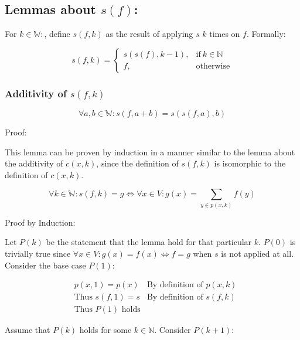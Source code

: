 \documentclass[11pt]{article}
\begin{document}
\subsection{Lemmas about $s(f)$:}

For $k\in \mathbb{W}:$, define $s(f,k)$ as the result of applying $s$ $k$ times on $f$. Formally:

\begin{equation}
    s(f,k)=
        \begin{cases}
            s(s(f),k-1), & \text{if}\ k \in \mathbb{N} \\
            f, & \text{otherwise}
        \end{cases}
    \label{define_sfk}
\end{equation}

\subsubsection{Additivity of $s(f,k)$}

\begin{equation}
    \forall a,b \in \mathbb{W}: s(f,a+b) = s(s(f,a),b)
    \label{additivity_sfk}
\end{equation}

Proof:

This lemma can be proven by induction in a manner similar to the lemma about the additivity of $c(x,k)$, since the definition of $s(f,k)$ is isomorphic to the definition of $c(x,k)$.

\begin{equation}
    \forall k \in \mathbb{W}: s(f,k)=g \Leftrightarrow \forall x \in V: g(x) = \sum_{y \in p(x,k)} f(y)
    \label{alternate_sfk}
\end{equation}

Proof by Induction:

Let $P(k)$ be the statement that the lemma hold for that particular $k$. $P(0)$ is trivially true since $\forall x \in V: g(x) = f(x) \Leftrightarrow f=g$ when $s$ is not applied at all. Consider the base case $P(1)$:

\begin{align*}
& \text{$p(x,1)=p(x)$} & \text{By definition of $p(x,k)$} \\
& \text{Thus $s(f,1)=s$} & \text{By definition of $s(f,k)$} \\
& \text{Thus $P(1)$ holds} & \text{}
\end{align*}

Assume that $P(k)$ holds for some $k\in \mathbb{N}$. Consider $P(k+1)$:
\end{document}
